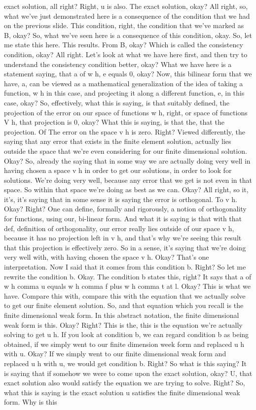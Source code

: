 \documentclass[10pt]{article}
\begin{document}
{exact solution, all right? Right, u is also. The exact solution, okay? All right, so, what we've just demonstrated here is a consequence of the condition that we had on the previous slide. This condition, right, the condition that we've marked as B, okay? So, what we've seen here is a consequence of this condition, okay. So, let me state this here. This results. From B, okay? Which is called the consistency condition, okay? All right. Let's look at what we have here first, and then try to understand the consistency condition better, okay? What we have here is a statement saying, that a of w h, e equals 0, okay? Now, this bilinear form that we have, a, can be viewed as a mathematical generalization of the idea of taking a function, w h in this case, and projecting it along a different function, e, in this case, okay? So, effectively, what this is saying, is that suitably defined, the projection of the error on our space of functions w h, right, or space of functions V h, that projection is 0, okay? What this is saying, is that the, that the projection. Of The error on the space v h is zero. Right? Viewed differently, the saying that any error that exists in the finite element solution, actually lies outside the space that we're even considering for our finite dimensional solution. Okay? So, already the saying that in some way we are actually doing very well in having chosen a space v h in order to get our solutions, in order to look for solutions. We're doing very well, because any error that we get is not even in that space. So within that space we're doing as best as we can. Okay? All right, so it, it's, it's saying that in some sense it is saying the error is orthogonal. To v h. Okay? Right? One can define, formally and rigorously, a notion of orthogonality for functions, using our, bi-linear form. And what it is saying is that with that def, definition of orthogonality, our error really lies outside of our space v h, because it has no projection left in v h, and that's why we're seeing this result that this projection is effectively zero. So in a sense, it's saying that we're doing very well with, with having chosen the space v h. Okay? That's one interpretation. Now I said that it comes from this condition b. Right? So let me rewrite the condition b. Okay. The condition b states this, right? It says that a of w h comma u equals w h comma f plus w h comma t at l. Okay? This is what we have. Compare this with, compare this with the equation that we actually solve to get our finite element solution. So, and that equation which you recall is the finite dimensional weak form. In this abstract notation, the finite dimensional weak form is this. Okay? Right? This is the, this is the equation we're actually solving to get u h. If you look at condition b, we can regard condition b as being obtained, if we simply went to our finite dimension week form and replaced u h with u. Okay? If we simply went to our finite dimensional weak form and replaced u h with u, we would get condition b. Right? So what is this saying? It is saying that if somehow we were to come upon the exact solution, okay? U, that exact solution also would satisfy the equation we are trying to solve. Right? So, what this is saying is the exact solution u satisfies the finite dimensional weak form. Why is this }
\end{document}
